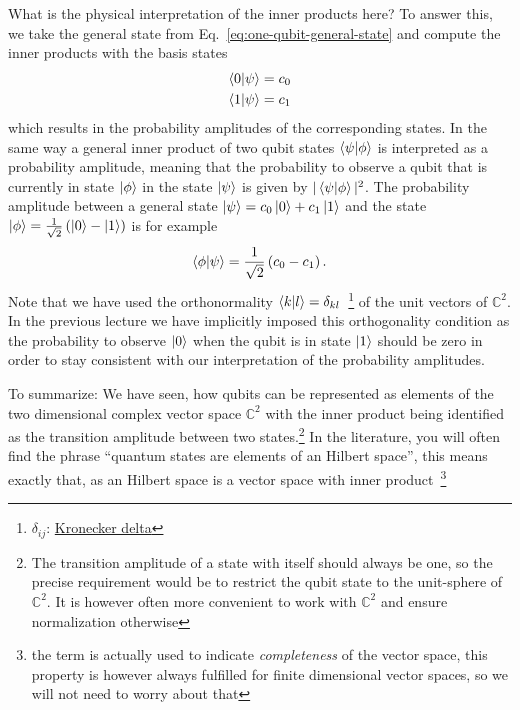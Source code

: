 What is the physical interpretation of the inner products here? To answer this, we take the general state from Eq.~\eqref{eq:one-qubit-general-state} and compute the inner products with the basis states
\begin{align}
    \braket{0}{\psi} = c_0 \\
    \braket{1}{\psi} = c_1 
\end{align}
which results in the probability amplitudes of the corresponding states. In the same way a general inner product of two qubit states $\braket{\psi}{\phi}$ is interpreted as a probability amplitude, meaning that the probability to observe a qubit that is currently in state $\ket{\phi}$ in the state $\ket{\psi}$ is given by $|\braket{\psi}{\phi}|^2$.
The probability amplitude between a general state $\ket{\psi} = c_0\ket{0} + c_1\ket{1}$  and the state $\ket{\phi}=\frac{1}{\sqrt{2}}\left(\ket{0} - \ket{1}\right)$ is for example
\begin{align}
    \braket{\phi}{\psi} = \frac{1}{\sqrt{2}}\left( c_0 - c_1 \right).
\end{align}
Note that we have used the orthonormality $\braket{k}{l}=\delta_{kl}$~\footnote{$\delta_{ij}$: \hyperlink{https://de.wikipedia.org/wiki/Kronecker-Delta}{Kronecker delta}} of the unit vectors of $\mathbb{C}^2$. In the previous lecture we have implicitly imposed this orthogonality condition as the probability to observe $\ket{0}$ when the qubit is in state $\ket{1}$ should be zero in order to stay consistent with our interpretation of the probability amplitudes.

To summarize: We have seen, how qubits can be represented as elements of the two dimensional complex vector space $\mathbb{C}^2$ with the inner product being identified as the transition amplitude between two states.\footnote{The transition amplitude of a state with itself should always be one, so the precise requirement would be to restrict the qubit state to the unit-sphere of $\mathbb{C}^2$. It is however often more convenient to work with $\mathbb{C}^2$ and ensure normalization otherwise}
In the literature, you will often find the phrase ``quantum states are elements of an Hilbert space'', this means exactly that, as an Hilbert space is a vector space with inner product~\footnote{the term is actually used to indicate \textit{completeness} of the vector space, this property is however always fulfilled for finite dimensional vector spaces, so we will not need to worry about that}

